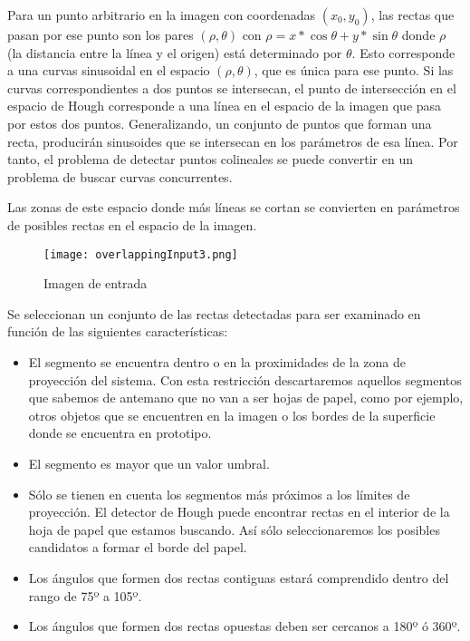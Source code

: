 Para un punto arbitrario en la imagen con coordenadas $(x_0,y_0)$, las rectas que pasan por ese punto son los pares  $(\rho,\theta)$ con  $\rho=x*\cos \theta + y * \sin \theta$ donde $\rho$ (la distancia entre la línea y el origen) está determinado por $\theta$. Esto corresponde a una curvas sinusoidal en el espacio  $(\rho,\theta)$, que es única para ese punto. Si las curvas correspondientes  a dos puntos se intersecan, el punto de intersección en el espacio de Hough corresponde  a una línea en el espacio de la imagen que pasa por estos dos puntos. Generalizando, un conjunto de puntos que forman una recta, producirán sinusoides que se intersecan en los parámetros de esa línea. Por tanto, el problema de detectar puntos colineales se puede convertir en un problema
de buscar curvas concurrentes.

Las zonas de este espacio donde más líneas se cortan se convierten en parámetros de posibles rectas en el espacio de la imagen.

 \begin{figure}[h!] 
    \centering
    \texttt{[image: overlappingInput3.png]}
    \caption{Imagen de entrada}
    \label{fig:overlapping}
  \end{figure}

Se seleccionan un conjunto de las rectas detectadas para ser examinado en función de las siguientes características:

\begin{itemize}
\item El segmento se encuentra dentro o en la proximidades de la zona de proyección del
  sistema. Con esta restricción descartaremos aquellos segmentos que sabemos de antemano que no van
  a ser hojas de papel, como por ejemplo, otros objetos que se encuentren en la imagen o los bordes
  de la superficie donde se encuentra en prototipo.
  
\item El segmento es mayor que un valor umbral.
\item Sólo se tienen en cuenta los segmentos más próximos a los límites de proyección. El detector
  de Hough puede encontrar rectas en el interior de la hoja de papel que estamos buscando. Así sólo
  seleccionaremos los posibles candidatos a formar el borde del papel.
 \item Los ángulos que formen dos rectas contiguas estará comprendido dentro del rango de 75º a 105º.
\item Los ángulos que formen dos rectas opuestas deben ser cercanos a 180º ó 360º.
\end{itemize}

